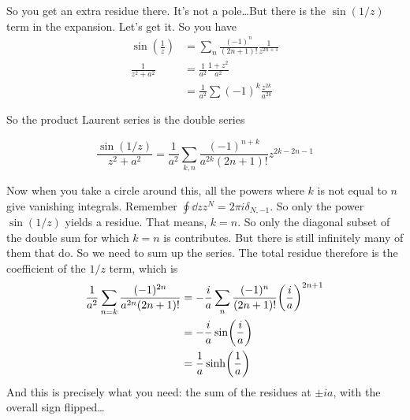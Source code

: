 \documentclass{article}
\begin{document}
So you get an extra residue there. It's not a pole\ldots But there is the $\sin(1/z)$ term in the expansion. Let's get it. So you have
\[
\begin{aligned}
    \sin(\frac{1}{z}) &= \sum_n \frac{(-1)^n}{(2n+1)!} \frac{1}{z^{2n+1}} \\
    \frac{1}{z^2+a^2} &= \frac{1}{a^2} \frac{1+ z^2}{a^2} \\
    &= \frac{1}{a^2} \sum (-1)^k \frac{z^{2k}}{a^{2k}}
\end{aligned}
\]

So the product Laurent series is the double series

\[
\frac{\sin(1/z)}{z^2+a^2} = \frac{1}{a^2} \sum_{k,n} \frac{(-1)^{n+k}}{a^{2k}(2n+1)! } z^{2k-2n-1}
\]

Now when you take a circle around this, all the powers where $k$ is not equal to $n$ give vanishing integrals. Remember $\oint \dd{z} z^N = 2\pi i \delta_{N,-1}$. So only the power $\sin(1/z)$ yields a residue. That means, $k = n$. So only the diagonal subset of the double sum for which $k = n$ is contributes. But there is still infinitely many of them that do. So we need to sum up the series. The total residue therefore is the coefficient of the $1/z$ term, which is
\[
\begin{aligned}
    \frac{1}{a^2} \sum_{n=k} \frac{(-1)^{2n}}{a^{2n}(2n+1)!} &= - \frac{i}{a}\sum_n\frac{(-1)^{n}}{(2n+1)!} \qty(\frac{i}{a})^{2n+1} \\
    &= - \frac{i}{a} \sin(\frac{i}{a}) \\
    &= \frac{1}{a} \sinh(\frac{1}{a})
\end{aligned}
\]
And this is precisely what you need: the sum of the residues at $\pm ia$, with the overall sign flipped\ldots
\end{document}
